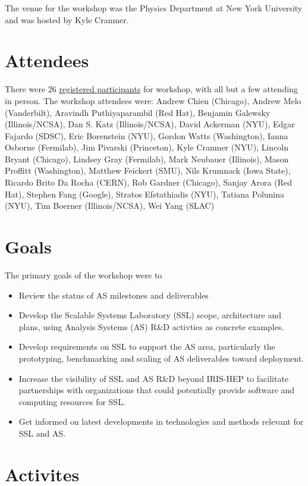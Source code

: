 \documentclass[11pt,letterpaper,fleqn]{article}
\begin{document}
The venue for the workshop was the Physics Department at New York University and was hosted by Kyle Cranmer.

\section{Attendees}
There were 26 \href{https://indico.cern.ch/event/820946/registrations/participants}{registered participants} for workshop, with all but a few attending in person. The workshop attendees were:
Andrew Chien (Chicago),
Andrew Melo (Vanderbilt),
Aravindh Puthiyaparambil (Red Hat),
Benjamin Galewsky (Illinois/NCSA),
Dan S. Katz (Illinois/NCSA),
David Ackerman (NYU),
Edgar Fajardo (SDSC),
Eric Borenstein (NYU),
Gordon Watts (Washington),
Ianna Osborne (Fermilab),
Jim Pivarski (Princeton),
Kyle Cranmer (NYU),
Lincoln Bryant (Chicago),
Lindsey Gray (Fermilab),
Mark Neubauer (Illinois),
Mason Proffitt (Washington),
Matthew Feickert (SMU),
Nils Krumnack (Iowa State),
Ricardo Brito Da Rocha (CERN),
Rob Gardner (Chicago),
Sanjay Arora (Red Hat),
Stephen Fang (Google),
Stratos Efstathiadis (NYU),
Tatiana Polunina (NYU),
Tim Boerner (Illinois/NCSA),
Wei Yang (SLAC)

\section{Goals}
The primary goals of the workshop were to
\begin{itemize}
  \item Review the status of AS milestones and deliverables
  \item Develop the Scalable Systems Laboratory (SSL) scope, architecture and plans, using Analysis Systems (AS) R\&D activties as concrete examples.
  \item Develop requirements on SSL to support the AS area, particularly the prototyping, benchmarking and scaling of AS deliverables toward deployment.
  \item Increase the visibility of SSL and AS R\&D beyond IRIS-HEP to facilitate partnerships with organizations that could potentially provide software and computing resources for SSL.
  \item Get informed on latest developments in technologies and methods relevant for SSL and AS.
\end{itemize}

\section{Activites}
\blindtext[2]
\end{document}
